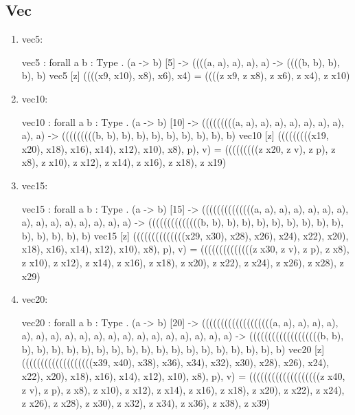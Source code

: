 \subsection{Vec}
\begin{enumerate}
\item vec5:
\begin{granule}
vec5 : forall { a b : Type }
     . (a -> b) [5] 
     -> ((((a, a), a), a), a) 
     -> ((((b, b), b), b), b)
vec5 [z] ((((x9, x10), x8), x6), x4) = 
    ((((z x9, z x8), z x6), z x4), z x10)
\end{granule}
\item vec10:
\begin{granule}
vec10 : forall { a b : Type }
      . (a -> b) [10] 
      -> (((((((((a, a), a), a), a), a), a), a), a), a)
      -> (((((((((b, b), b), b), b), b), b), b), b), b)
vec10 [z] (((((((((x19, x20), x18), x16), x14), x12), x10), x8), p), v) = 
    (((((((((z x20, z v), z p), z x8), z x10), z x12), z x14), z x16), z x18), z x19)
\end{granule}
\item vec15:
\begin{granule}
vec15 : forall { a b : Type }
      . (a -> b) [15] 
      -> ((((((((((((((a, a), a), a), a), a), a), a), a), a), a), a), a), a), a)
      -> ((((((((((((((b, b), b), b), b), b), b), b), b), b), b), b), b), b), b)
vec15 [z] ((((((((((((((x29, x30), x28), x26), x24), x22), x20), x18), x16), x14), x12), x10), x8), p), v) = 
    ((((((((((((((z x30, z v), z p), z x8), z x10), z x12), z x14), z x16), z x18), z x20), z x22), z x24), z x26), z x28), z x29)
\end{granule}
\item vec20:
\begin{granule}
vec20 : forall { a b : Type }
      . (a -> b) [20] 
      -> (((((((((((((((((((a, a), a), a), a), a), a), a), a), a), a), a), a), a), a), a), a), a), a), a)
      -> (((((((((((((((((((b, b), b), b), b), b), b), b), b), b), b), b), b), b), b), b), b), b), b), b)
vec20 [z] (((((((((((((((((((x39, x40), x38), x36), x34), x32), x30), x28), x26), x24), x22), x20), x18), x16), x14), x12), x10), x8), p), v) = 
    (((((((((((((((((((z x40, z v), z p), z x8), z x10), z x12), z x14), z x16), z x18), z x20), z x22), z x24), z x26), z x28), z x30), z x32), z x34), z x36), z x38), z x39)
\end{granule}
\end{enumerate}

